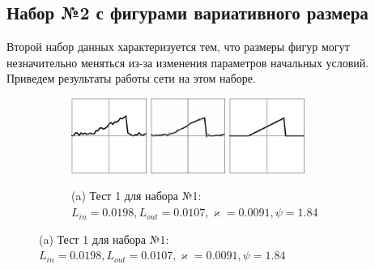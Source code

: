 \documentclass[12pt, a4paper]{article}
\renewcommand{\kappa}{\varkappa}
\begin{document}
\newpage
\subsection{Набор №2 с фигурами вариативного размера}
Второй набор данных характеризуется тем, что размеры фигур могут незначительно меняться из-за изменения параметров начальных условий. Приведем результаты работы сети на этом наборе.

\begin{figure}[!hp]
	\centering
	\begin{subfigure}{\textwidth}
		\centering
		\includegraphics[width=0.27\textwidth]{res_n1_1}
		\hfill
		\includegraphics[width=0.27\textwidth]{res_n2_2}
		\hfill
		\includegraphics[width=0.27\textwidth]{1}
		\caption*{\small (a) Тест 1 для набора №1: 
			$L_{in} = 0.0198,
			 L_{out} = 0.0107, 
			\kappa = 0.0091,
			 \psi = 1.84
			 $}
	\end{subfigure}
	

\end{figure}
\end{document}

